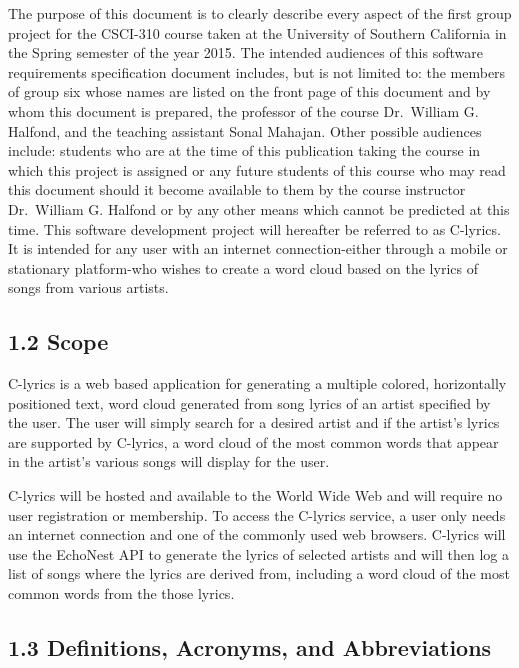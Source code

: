 \documentclass[]{article}
\begin{document}
The purpose of this document is to clearly describe every aspect of the
first group project for the CSCI-310 course taken at the University of
Southern California in the Spring semester of the year 2015. The
intended audiences of this software requirements specification document
includes, but is not limited to: the members of group six whose names
are listed on the front page of this document and by whom this document
is prepared, the professor of the course Dr.~William G. Halfond, and the
teaching assistant Sonal Mahajan. Other possible audiences include:
students who are at the time of this publication taking the course in
which this project is assigned or any future students of this course who
may read this document should it become available to them by the course
instructor Dr.~William G. Halfond or by any other means which cannot be
predicted at this time. This software development project will hereafter
be referred to as C-lyrics. It is intended for any user with an internet
connection-either through a mobile or stationary platform-who wishes to
create a word cloud based on the lyrics of songs from various artists.

\subsection{1.2 Scope}\label{scope}

C-lyrics is a web based application for generating a multiple colored,
horizontally positioned text, word cloud generated from song lyrics of
an artist specified by the user. The user will simply search for a
desired artist and if the artist's lyrics are supported by C-lyrics, a
word cloud of the most common words that appear in the artist's various
songs will display for the user.

C-lyrics will be hosted and available to the World Wide Web and will
require no user registration or membership. To access the C-lyrics
service, a user only needs an internet connection and one of the
commonly used web browsers. C-lyrics will use the EchoNest API to
generate the lyrics of selected artists and will then log a list of
songs where the lyrics are derived from, including a word cloud of the
most common words from the those lyrics.

\subsection{1.3 Definitions, Acronyms, and
Abbreviations}\label{definitions-acronyms-and-abbreviations}
\end{document}
